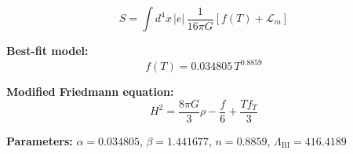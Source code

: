 
\begin{equation}
  S = \int d^4x \, |e| \, \frac{1}{16\pi G} \left[ f(T) + \mathcal{L}_m \right]
\end{equation}

\textbf{Best-fit model:}
\begin{equation}
  f(T) = 0.034805 \, T^{0.8859}
\end{equation}

\textbf{Modified Friedmann equation:}
\begin{equation}
  H^2 = \frac{8\pi G}{3} \rho - \frac{f}{6} + \frac{T f_T}{3}
\end{equation}

\textbf{Parameters:}
$\alpha = 0.034805$, \quad
$\beta = 1.441677$, \quad
$n = 0.8859$, \quad
$\Lambda_{\text{BI}} = 416.4189$